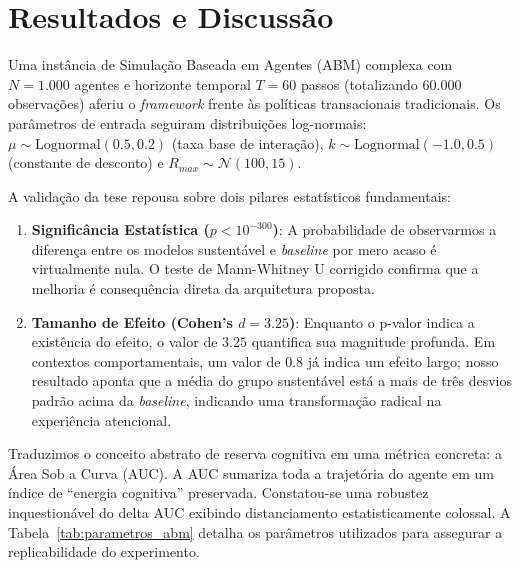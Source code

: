 \documentclass{sbc2023}
\begin{document}
\section{Resultados e Discussão} \label{sec:evaluation}

Uma instância de Simulação Baseada em Agentes (ABM) complexa com $N=1.000$ agentes e horizonte temporal $T=60$ passos (totalizando $60.000$ observações) aferiu o \textit{framework} frente às políticas transacionais tradicionais. Os parâmetros de entrada seguiram distribuições log-normais: $\mu \sim \text{Lognormal}(0.5, 0.2)$ (taxa base de interação), $k \sim \text{Lognormal}(-1.0, 0.5)$ (constante de desconto) e $R_{max} \sim \mathcal{N}(100, 15)$.

A validação da tese repousa sobre dois pilares estatísticos fundamentais:
\begin{enumerate}
    \item \textbf{Significância Estatística ($p < 10^{-300}$)}: A probabilidade de observarmos a diferença entre os modelos sustentável e \textit{baseline} por mero acaso é virtualmente nula. O teste de Mann-Whitney U corrigido confirma que a melhoria é consequência direta da arquitetura proposta.
    \item \textbf{Tamanho de Efeito (Cohen's $d = 3.25$)}: Enquanto o p-valor indica a existência do efeito, o valor de $3.25$ quantifica sua magnitude profunda. Em contextos comportamentais, um valor de $0.8$ já indica um efeito largo; nosso resultado aponta que a média do grupo sustentável está a mais de três desvios padrão acima da \textit{baseline}, indicando uma transformação radical na experiência atencional.
\end{enumerate}

Traduzimos o conceito abstrato de reserva cognitiva em uma métrica concreta: a Área Sob a Curva (AUC). A AUC sumariza toda a trajetória do agente em um índice de ``energia cognitiva'' preservada. Constatou-se uma robustez inquestionável do delta AUC exibindo distanciamento estatisticamente colossal. A Tabela~\ref{tab:parametros_abm} detalha os parâmetros utilizados para assegurar a replicabilidade do experimento.
\end{document}
